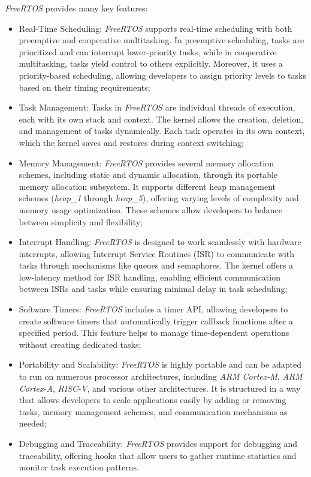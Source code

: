 \textit{FreeRTOS} provides many key features:
\begin{itemize}
  \item Real-Time Scheduling: \textit{FreeRTOS} supports real-time scheduling with
    both preemptive and cooperative multitasking. In preemptive scheduling, tasks
    are prioritized and can interrupt lower-priority tasks, while in cooperative
    multitasking, tasks yield control to others explicitly. Moreover, it uses a priority-based
    scheduling, allowing developers to assign priority levels to tasks based on
    their timing requirements;

  \item Task Management: Tasks in \textit{FreeRTOS} are individual threads of execution,
    each with its own stack and context. The kernel allows the creation,
    deletion, and management of tasks dynamically. Each task operates in its own
    context, which the kernel saves and restores during context switching;

  \item Memory Management: \textit{FreeRTOS} provides several memory allocation schemes,
    including static and dynamic allocation, through its portable memory allocation
    subsystem. It supports different heap management schemes (\textit{heap\_1}
    through \textit{heap\_5}), offering varying levels of complexity and memory usage
    optimization. These schemes allow developers to balance between simplicity
    and flexibility;

  \item Interrupt Handling: \textit{FreeRTOS} is designed to work seamlessly with
    hardware interrupts, allowing Interrupt Service Routines (ISR) to
    communicate with tasks through mechanisms like queues and semaphores. The kernel
    offers a low-latency method for ISR handling, enabling efficient
    communication between ISRs and tasks while ensuring minimal delay in task
    scheduling;

  \item Software Timers: \textit{FreeRTOS} includes a timer API, allowing
    developers to create software timers that automatically trigger callback
    functions after a specified period. This feature helps to manage time-dependent
    operations without creating dedicated tasks;

  \item Portability and Scalability: \textit{FreeRTOS} is highly portable and can
    be adapted to run on numerous processor architectures, including \textit{ARM
    Cortex-M}, \textit{ARM Cortex-A}, \textit{RISC-V}, and various other
    architectures. It is structured in a way that allows developers to scale applications
    easily by adding or removing tasks, memory management schemes, and communication
    mechanisms as needed;

  \item Debugging and Traceability: \textit{FreeRTOS} provides support for debugging
    and traceability, offering hooks that allow users to gather runtime
    statistics and monitor task execution patterns.
\end{itemize}

